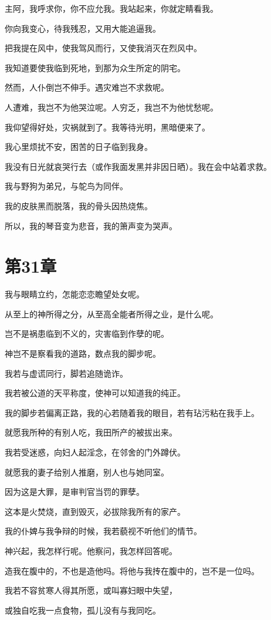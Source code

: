 \documentclass[12pt,oneside]{book}
\begin{document}
主阿，我呼求你，你不应允我。我站起来，你就定睛看我。

你向我变心，待我残忍，又用大能追逼我。

把我提在风中，使我驾风而行，又使我消灭在烈风中。

我知道要使我临到死地，到那为众生所定的阴宅。

然而，人仆倒岂不伸手。遇灾难岂不求救呢。

人遭难，我岂不为他哭泣呢。人穷乏，我岂不为他忧愁呢。

我仰望得好处，灾祸就到了。我等待光明，黑暗便来了。

我心里烦扰不安，困苦的日子临到我身。

我没有日光就哀哭行去（或作我面发黑并非因日晒）。我在会中站着求救。

我与野狗为弟兄，与鸵鸟为同伴。

我的皮肤黑而脱落，我的骨头因热烧焦。

所以，我的琴音变为悲音，我的箫声变为哭声。


\chapter{第31章}
我与眼睛立约，怎能恋恋瞻望处女呢。

从至上的神所得之分，从至高全能者所得之业，是什么呢。

岂不是祸患临到不义的，灾害临到作孽的呢。

神岂不是察看我的道路，数点我的脚步呢。

我若与虚谎同行，脚若追随诡诈。

我若被公道的天平称度，使神可以知道我的纯正。

我的脚步若偏离正路，我的心若随着我的眼目，若有玷污粘在我手上。

就愿我所种的有别人吃，我田所产的被拔出来。

我若受迷惑，向妇人起淫念，在邻舍的门外蹲伏。

就愿我的妻子给别人推磨，别人也与她同室。

因为这是大罪，是审判官当罚的罪孽。

这本是火焚烧，直到毁灭，必拔除我所有的家产。

我的仆婢与我争辩的时候，我若藐视不听他们的情节。

神兴起，我怎样行呢。他察问，我怎样回答呢。

造我在腹中的，不也是造他吗。将他与我抟在腹中的，岂不是一位吗。

我若不容贫寒人得其所愿，或叫寡妇眼中失望，

或独自吃我一点食物，孤儿没有与我同吃。
\end{document}
